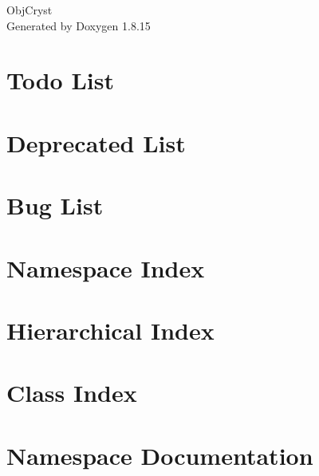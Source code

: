 \let\mypdfximage\pdfximage\def\pdfximage{\immediate\mypdfximage}\documentclass[twoside]{book}
\newcommand{\+}{\discretionary{\mbox{\scriptsize$\hookleftarrow$}}{}{}}
\newcommand{\clearemptydoublepage}{%
  \newpage{\pagestyle{empty}\cleardoublepage}%
}
\begin{document}
\hypersetup{pageanchor=false,
             bookmarksnumbered=true,
             pdfencoding=unicode
            }
\begin{titlepage}
\vspace*{7cm}
\begin{center}%
{\Large Obj\+Cryst }\\
\vspace*{1cm}
{\large Generated by Doxygen 1.8.15}\\
\end{center}
\end{titlepage}
\clearemptydoublepage
{}
\tableofcontents
\clearemptydoublepage
{}
\hypersetup{pageanchor=true}

\chapter{Todo List}
\label{todo}

\chapter{Deprecated List}
\label{deprecated}

\chapter{Bug List}
\label{bug}

\chapter{Namespace Index}

\chapter{Hierarchical Index}

\chapter{Class Index}

\chapter{Namespace Documentation}

\end{document}

